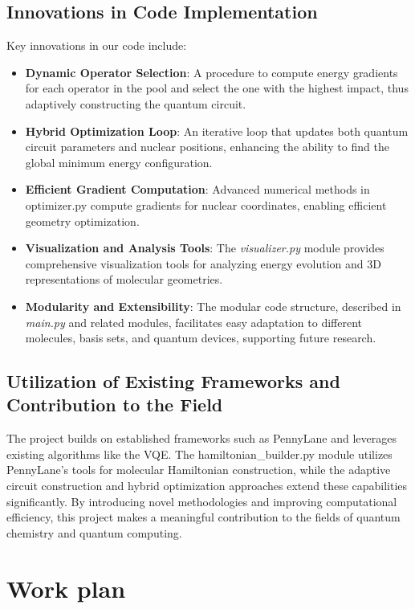 \subsection*{Innovations in Code Implementation}

Key innovations in our code include:

\begin{itemize} 
  \item \textbf{Dynamic Operator Selection}: A procedure to compute energy gradients for each operator in the pool and select the one with the highest impact, thus adaptively constructing the quantum circuit. 
  \item \textbf{Hybrid Optimization Loop}: An iterative loop that updates both quantum circuit parameters and nuclear positions, enhancing the ability to find the global minimum energy configuration. 
  \item \textbf{Efficient Gradient Computation}: Advanced numerical methods in optimizer.py compute gradients for nuclear coordinates, enabling efficient geometry optimization.
  \item \textbf{Visualization and Analysis Tools}: The \textit{visualizer.py} module provides comprehensive visualization tools for analyzing energy evolution and 3D representations of molecular geometries.
  \item \textbf{Modularity and Extensibility}: The modular code structure, described in \textit{main.py} and related modules, facilitates easy adaptation to different molecules, basis sets, and quantum devices, supporting future research. 
\end{itemize}

\subsection*{Utilization of Existing Frameworks and Contribution to the Field}

The project builds on established frameworks such as PennyLane and leverages existing algorithms like the VQE. The hamiltonian\_builder.py module utilizes PennyLane's tools for molecular Hamiltonian construction, while the adaptive circuit construction and hybrid optimization approaches extend these capabilities significantly. By introducing novel methodologies and improving computational efficiency, this project makes a meaningful contribution to the fields of quantum chemistry and quantum computing.

\section{Work plan}

